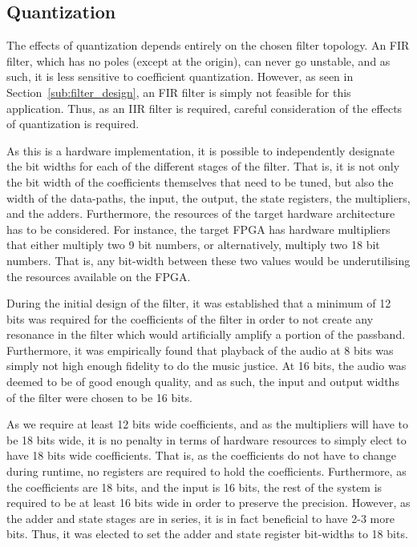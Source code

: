 \documentclass[]{article}
\begin{document}
\subsection{Quantization} %
\label{sub:quantization}

The effects of quantization depends entirely on the chosen filter topology. An FIR filter, which has no poles (except at the origin), can never go unstable, and as such, it is less sensitive to coefficient quantization. However, as seen in Section~\ref{sub:filter_design}, an FIR filter is simply not feasible for this application. Thus, as an IIR filter is required, careful consideration of the effects of quantization is required.

As this is a hardware implementation, it is possible to independently designate the bit widths for each of the different stages of the filter. That is, it is not only the bit width of the coefficients themselves that need to be tuned, but also the width of the data-paths, the input, the output, the state registers, the multipliers, and the adders. Furthermore, the resources of the target hardware architecture has to be considered.
For instance, the target FPGA has hardware multipliers that either multiply two 9 bit numbers, or alternatively, multiply two 18 bit numbers. That is, any bit-width between these two values would be underutilising the resources available on the FPGA.

During the initial design of the filter, it was established that a minimum of 12 bits was required for the coefficients of the filter in order to not create any resonance in the filter which would artificially amplify a portion of the passband.
Furthermore, it was empirically found that playback of the audio at 8 bits was simply not high enough fidelity to do the music justice. At 16 bits, the audio was deemed to be of good enough quality, and as such, the input and output widths of the filter were chosen to be 16 bits.

As we require at least 12 bits wide coefficients, and as the multipliers will have to be 18 bits wide, it is no penalty in terms of hardware resources to simply elect to have 18 bits wide coefficients. That is, as the coefficients do not have to change during runtime, no registers are required to hold the coefficients.
Furthermore, as the coefficients are 18 bits, and the input is 16 bits, the rest of the system is required to be at least 16 bits wide in order to preserve the precision. However, as the adder and state stages are in series, it is in fact beneficial to have 2-3 more bits. Thus, it was elected to set the adder and state register bit-widths to 18 bits.
\end{document}
